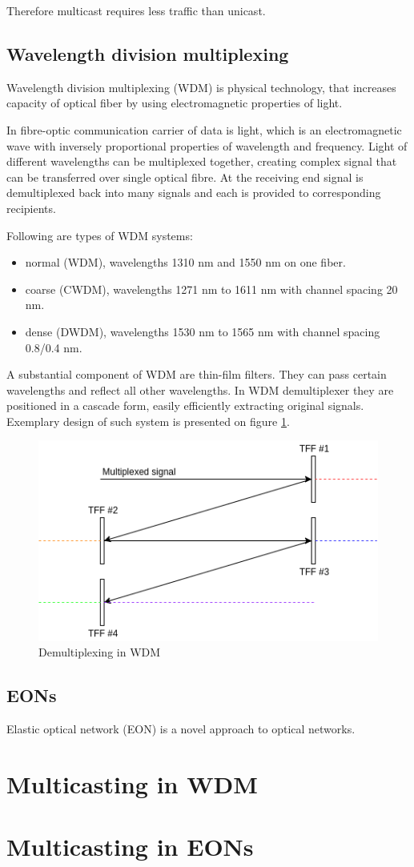 \documentclass[conference]{IEEEtran}
\begin{document}
Therefore multicast requires less traffic than unicast.

\subsection{Wavelength division multiplexing}
Wavelength division multiplexing (WDM) is physical technology, that increases capacity of optical fiber by using electromagnetic properties of light.

In fibre-optic communication carrier of data is light, which is an electromagnetic wave with inversely proportional properties of wavelength and frequency. Light of different wavelengths can be multiplexed together, creating complex signal that can be transferred over single optical fibre. At the receiving end signal is demultiplexed back into many signals and each is provided to corresponding recipients.

Following are types of WDM systems:
\begin{itemize}
	\item normal (WDM), wavelengths 1310 nm and 1550 nm on one fiber.
	\item coarse (CWDM), wavelengths 1271 nm to 1611 nm with channel spacing 20 nm.
	\item dense (DWDM), wavelengths 1530 nm to 1565 nm with channel spacing 0.8/0.4 nm.
\end{itemize}

A substantial component of WDM are thin-film filters. They can pass certain wavelengths and reflect all other wavelengths. In WDM demultiplexer they are positioned in a cascade form, easily efficiently extracting original signals. Exemplary design of such system is presented on figure  \ref{demultiplexing}.

\begin{figure}[htbp]
	\centerline{\includegraphics[scale=0.5]{demultiplexer.png}}
	\caption{Demultiplexing in WDM}
	\label{demultiplexing}
\end{figure}

\subsection{EONs}
Elastic optical network (EON) is a novel approach to optical networks. 

\section{Multicasting in WDM}

\section{Multicasting in EONs}

\begin{thebibliography}{00}
\end{thebibliography}
\end{document}
